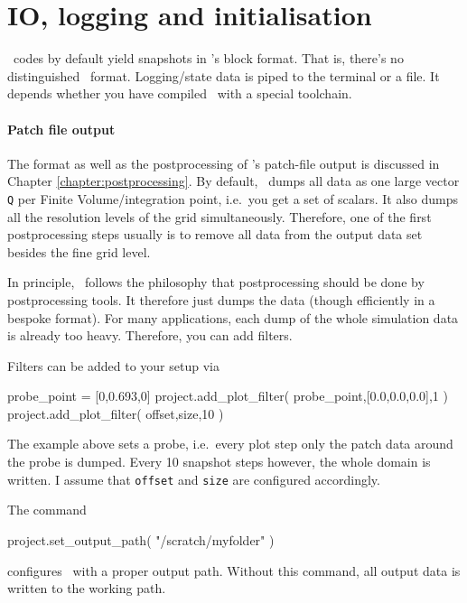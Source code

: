 \section{IO, logging and initialisation}


\ExaHyPE\ codes by default yield snapshots in \Peano's block format. 
That is, there's no distinguished \ExaHyPE\ format. 
Logging/state data is piped to the terminal or a file. 
It depends whether you have compiled \Peano\ with a special toolchain.


\paragraph{Patch file output}

The format as well as the postprocessing of \Peano's patch-file output is
discussed in Chapter \ref{chapter:postprocessing}.
By default, \ExaHyPE\ dumps all data as one large vector \texttt{Q} per Finite
Volume/integration point, i.e.~you get a set of scalars.
It also dumps all the resolution levels of the grid simultaneously.
Therefore, one of the first postprocessing steps usually is to remove all data
from the output data set besides the fine grid level.


\begin{remark}
 In principle, \Peano\ follows the philosophy that postprocessing should be done
 by postprocessing tools. It therefore just dumps the data (though efficiently
 in a bespoke format). For many applications, each dump of the whole
 simulation data is already too heavy. Therefore, you can add filters.
\end{remark}

\noindent
Filters can be added to your setup via
\begin{code}
probe_point = [0,0.693,0]
project.add_plot_filter( probe_point,[0.0,0.0,0.0],1 )
project.add_plot_filter( offset,size,10 )
\end{code}

\noindent
The example above sets a probe, i.e.~every plot step only the patch data around
the probe is dumped. Every 10 snapshot steps however, the whole domain is
written.
I assume that \texttt{offset} and \texttt{size} are configured accordingly.


The command
\begin{code}
project.set_output_path( "/scratch/myfolder" )
\end{code}
\noindent
configures \Peano\ with a proper output path. Without this command, all output
data is written to the working path.


